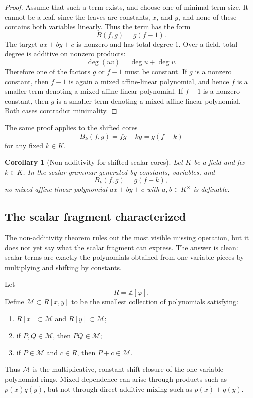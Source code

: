 \documentclass[11pt]{article}
\newtheorem{corollary}[definition]{Corollary}
\newcommand{\ph}{\varphi}
\newcommand{\Z}{\mathbb{Z}}
\begin{document}
\begin{proof}
Assume that such a term exists, and choose one of minimal term size.  It cannot be a leaf, since the leaves are constants, $x$, and $y$, and none of these contains both variables linearly.  Thus the term has the form
\[
    B(f,g)=g(f-1).
\]
The target $ax+by+c$ is nonzero and has total degree $1$.  Over a field, total degree is additive on nonzero products:
\[
    \deg(uv)=\deg u+\deg v.
\]
Therefore one of the factors $g$ or $f-1$ must be constant.  If $g$ is a nonzero constant, then $f-1$ is again a mixed affine-linear polynomial, and hence $f$ is a smaller term denoting a mixed affine-linear polynomial.  If $f-1$ is a nonzero constant, then $g$ is a smaller term denoting a mixed affine-linear polynomial.  Both cases contradict minimality.
\end{proof}

The same proof applies to the shifted cores
\[
    B_k(f,g)=fg-kg=g(f-k)
\]
for any fixed $k\in K$.

\begin{corollary}[Non-additivity for shifted scalar cores]\label{cor:shifted-nonadditivity}
Let $K$ be a field and fix $k\in K$.  In the scalar grammar generated by constants, variables, and
\[
    B_k(f,g)=g(f-k),
\]
no mixed affine-linear polynomial $ax+by+c$ with $a,b\in K^\times$ is definable.
\end{corollary}

\subsection{The scalar fragment characterized}\label{subsec:scalar-characterization}

The non-additivity theorem rules out the most visible missing operation, but it does not yet say what the scalar fragment can express.  The answer is clean: scalar terms are exactly the polynomials obtained from one-variable pieces by multiplying and shifting by constants.

Let
\[
    R=\Z[\ph].
\]
Define $\mathcal M\subset R[x,y]$ to be the smallest collection of polynomials satisfying:
\begin{enumerate}[label=(\roman*)]
    \item $R[x]\subset \mathcal M$ and $R[y]\subset \mathcal M$;
    \item if $P,Q\in\mathcal M$, then $PQ\in\mathcal M$;
    \item if $P\in\mathcal M$ and $c\in R$, then $P+c\in\mathcal M$.
\end{enumerate}
Thus $\mathcal M$ is the multiplicative, constant-shift closure of the one-variable polynomial rings.  Mixed dependence can arise through products such as $p(x)q(y)$, but not through direct additive mixing such as $p(x)+q(y)$.
\end{document}
